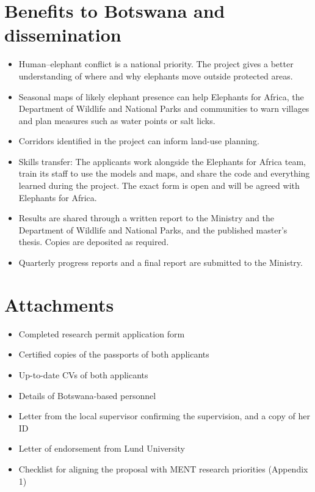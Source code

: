 \documentclass[12pt,a4paper]{article}
\begin{document}
\section{Benefits to Botswana and dissemination}
\label{sec:benefits}
\begin{itemize}
\item Human--elephant conflict is a national priority. The project gives a better understanding of where and why elephants move outside protected areas.
\item Seasonal maps of likely elephant presence can help Elephants for Africa, the Department of Wildlife and National Parks and communities to warn villages and plan measures such as water points or salt licks.
\item Corridors identified in the project can inform land-use planning.
\item Skills transfer: The applicants work alongside the Elephants for Africa team, train its staff to use the models and maps, and share the code and everything learned during the project. The exact form is open and will be agreed with Elephants for Africa.
\item Results are shared through a written report to the Ministry and the Department of Wildlife and National Parks, and the published master's thesis. Copies are deposited as required.
\item Quarterly progress reports and a final report are submitted to the Ministry.
\end{itemize}

\section{Attachments}
\begin{itemize}
\item Completed research permit application form
\item Certified copies of the passports of both applicants
\item Up-to-date CVs of both applicants
\item Details of Botswana-based personnel
\item Letter from the local supervisor confirming the supervision, and a copy of her ID
\item Letter of endorsement from Lund University
\item Checklist for aligning the proposal with MENT research priorities (Appendix 1)
\end{itemize}
\end{document}
